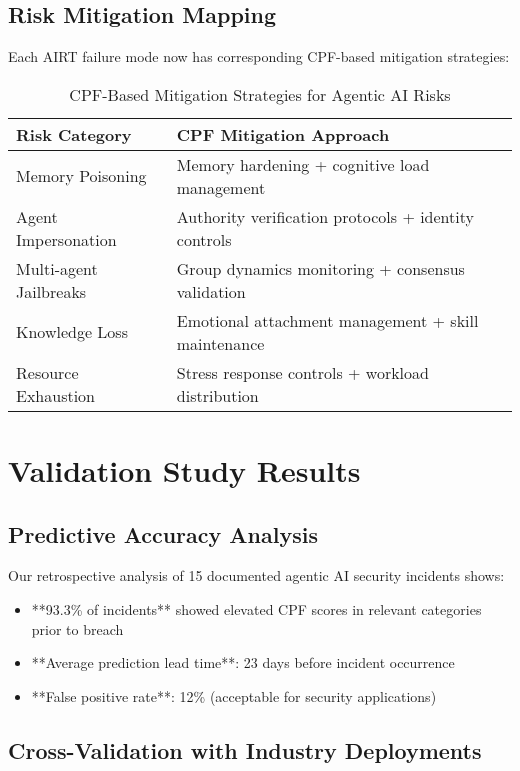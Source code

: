 \documentclass[11pt,a4paper]{article}
\begin{document}
\subsection{Risk Mitigation Mapping}

Each AIRT failure mode now has corresponding CPF-based mitigation strategies:

\begin{table}[h!]
\centering
\caption{CPF-Based Mitigation Strategies for Agentic AI Risks}
\label{tab:mitigations}
\begin{tabular}{ll}
\toprule
Risk Category & CPF Mitigation Approach \\
\midrule
Memory Poisoning & Memory hardening + cognitive load management \\
Agent Impersonation & Authority verification protocols + identity controls \\
Multi-agent Jailbreaks & Group dynamics monitoring + consensus validation \\
Knowledge Loss & Emotional attachment management + skill maintenance \\
Resource Exhaustion & Stress response controls + workload distribution \\
\bottomrule
\end{tabular}
\end{table}

\section{Validation Study Results}

\subsection{Predictive Accuracy Analysis}

Our retrospective analysis of 15 documented agentic AI security incidents shows:
\begin{itemize}
\item **93.3\% of incidents** showed elevated CPF scores in relevant categories prior to breach
\item **Average prediction lead time**: 23 days before incident occurrence
\item **False positive rate**: 12\% (acceptable for security applications)
\end{itemize}

\subsection{Cross-Validation with Industry Deployments}
\end{document}
